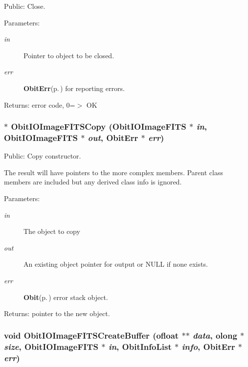 Public: Close. 

\begin{Desc}
\item[Parameters:]
\begin{description}
\item[{\em in}]Pointer to object to be closed. \item[{\em err}]{\bf Obit\-Err}{\rm (p.\,\pageref{structObitErr})} for reporting errors. \end{description}
\end{Desc}
\begin{Desc}
\item[Returns:]error code, 0=$>$ OK \end{Desc}
\subsubsection{$\ast$ Obit\-IOImage\-FITSCopy ({\bf Obit\-IOImage\-FITS} $\ast$ {\em in}, {\bf Obit\-IOImage\-FITS} $\ast$ {\em out}, {\bf Obit\-Err} $\ast$ {\em err})}\label{ObitIOImageFITS_8h_a9}


Public: Copy constructor. 

The result will have pointers to the more complex members. Parent class members are included but any derived class info is ignored. \begin{Desc}
\item[Parameters:]
\begin{description}
\item[{\em in}]The object to copy \item[{\em out}]An existing object pointer for output or NULL if none exists. \item[{\em err}]{\bf Obit}{\rm (p.\,\pageref{structObit})} error stack object. \end{description}
\end{Desc}
\begin{Desc}
\item[Returns:]pointer to the new object. \end{Desc}
\subsubsection{\setlength{\rightskip}{0pt plus 5cm}void Obit\-IOImage\-FITSCreate\-Buffer ({\bf ofloat} $\ast$$\ast$ {\em data}, {\bf olong} $\ast$ {\em size}, {\bf Obit\-IOImage\-FITS} $\ast$ {\em in}, {\bf Obit\-Info\-List} $\ast$ {\em info}, {\bf Obit\-Err} $\ast$ {\em err})}\label{ObitIOImageFITS_8h_a19}



